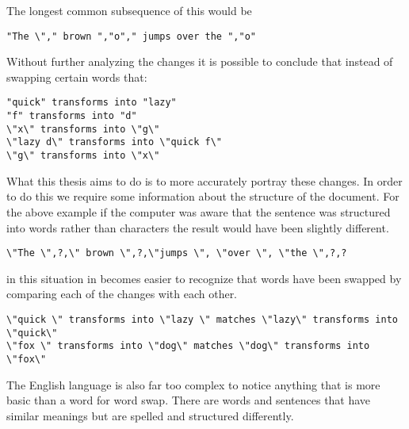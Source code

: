 The longest common subsequence of this would be

\begin{verbatim}
"The \"," brown ","o"," jumps over the ","o"
\end{verbatim}

Without further analyzing the changes it is possible to conclude that instead of swapping certain words that:

\begin{verbatim}
"quick" transforms into "lazy"
"f" transforms into "d"
\"x\" transforms into \"g\"
\"lazy d\" transforms into \"quick f\"
\"g\" transforms into \"x\"
\end{verbatim}

What this thesis aims to do is to more accurately portray these changes.
In order to do this we require some information about the structure of the document.
For the above example if the computer was aware that the sentence was structured into words rather than characters the result would have been slightly different.

\begin{verbatim}
\"The \",?,\" brown \",?,\"jumps \", \"over \", \"the \",?,?
\end{verbatim}

in this situation in becomes easier to recognize that words have been swapped by comparing each of the changes with each other.  

\begin{verbatim}
\"quick \" transforms into \"lazy \" matches \"lazy\" transforms into \"quick\"
\"fox \" transforms into \"dog\" matches \"dog\" transforms into \"fox\" 
\end{verbatim}

The English language is also far too complex to notice anything that is more basic than a word for word swap.
There are words and sentences that have similar meanings but are spelled and structured differently.

